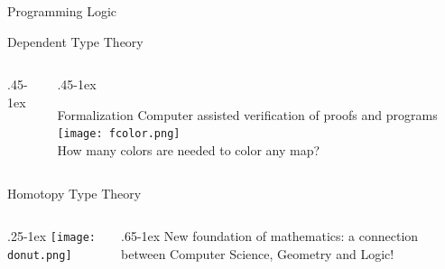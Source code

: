 \documentclass[final]{beamer}
\begin{document}
\begin{frame}{\rule{0}{2em}\Huge Programming Logic\vfill}
\begin{block}{Dependent Type Theory}
\begin{columns}
\begin{column}{.45\textwidth-1ex}
      \end{column}
      \begin{column}{.45\textwidth-1ex}%
        \begin{block}{Formalization}
          {\small Computer assisted verification of proofs and
            programs}
          \texttt{[image: fcolor.png]}\\
          {\small How many colors are needed to color any map?}
        \end{block}

      \end{column}
    \end{columns}
    \begin{block}{Homotopy Type Theory}
      \begin{columns}
        \begin{column}{.25\textwidth-1ex}
          \texttt{[image: donut.png]}
        \end{column}
        \begin{column}{.65\textwidth-1ex}
          New foundation of mathematics: a connection between Computer
          Science, Geometry and Logic!
        \end{column}
      \end{columns}
    \end{block}

  \end{block}
\vfill
\end{frame}
\end{document}
